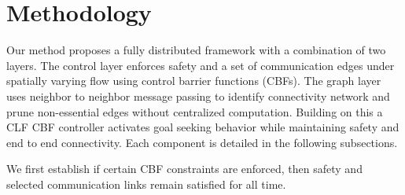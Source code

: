 \documentclass[conference]{IEEEconf}
\theoremstyle{plain}
\begin{document}


\section{Methodology}

\label{sec:method}

Our method proposes a fully distributed framework with a combination of two layers. The control layer enforces safety and a set of communication edges under spatially varying flow using control barrier functions (CBFs). The graph layer uses neighbor to neighbor message passing to identify connectivity network and prune non-essential edges without centralized computation. Building on this a CLF CBF controller activates goal seeking behavior while maintaining safety and end to end connectivity. Each component is detailed in the following subsections.

We first establish if certain CBF constraints are enforced, then safety and selected communication links remain satisfied for all time.

\end{document}
